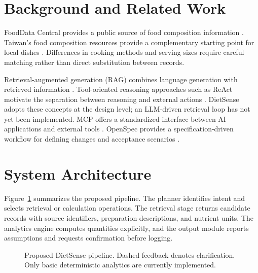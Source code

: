 \documentclass[conference]{IEEEtran}
\begin{document}
\section{Background and Related Work}
FoodData Central provides a public source of food composition information \cite{usda}. Taiwan's food composition resources provide a complementary starting point for local dishes \cite{taiwan}. Differences in cooking methods and serving sizes require careful matching rather than direct substitution between records.

Retrieval-augmented generation (RAG) combines language generation with retrieved information \cite{rag}. Tool-oriented reasoning approaches such as ReAct motivate the separation between reasoning and external actions \cite{react}. DietSense adopts these concepts at the design level; an LLM-driven retrieval loop has not yet been implemented. MCP offers a standardized interface between AI applications and external tools \cite{mcp}. OpenSpec provides a specification-driven workflow for defining changes and acceptance scenarios \cite{openspec}.
\section{System Architecture}
Figure~\ref{fig:arch} summarizes the proposed pipeline. The planner identifies intent and selects retrieval or calculation operations. The retrieval stage returns candidate records with source identifiers, preparation descriptions, and nutrient units. The analytics engine computes quantities explicitly, and the output module reports assumptions and requests confirmation before logging.
\begin{figure}[!t]
\centering
{}
\caption{Proposed DietSense pipeline. Dashed feedback denotes clarification. Only basic deterministic analytics are currently implemented.}
\label{fig:arch}
\end{figure}
\end{document}
